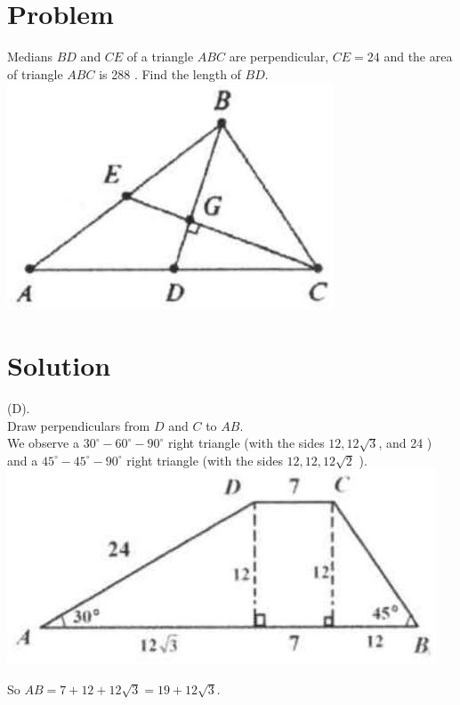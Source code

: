 \documentclass{article}
\begin{document}
\section*{Problem}
Medians \(B D\) and \(C E\) of a triangle \(A B C\) are perpendicular, \(C E=24\) and the area of triangle \(A B C\) is 288 . Find the length of \(B D\).\\
\centering
\includegraphics[width=\textwidth]{images/015(2).jpg}

\section*{Solution}
(D).\\
Draw perpendiculars from \(D\) and \(C\) to \(A B\).\\
We observe a \(30^{\circ}-60^{\circ}-90^{\circ}\) right triangle (with the sides \(12,12 \sqrt{3}\), and 24 ) and a \(45^{\circ}-45^{\circ}-90^{\circ}\) right triangle (with the sides \(12,12,12 \sqrt{2}\) ).\\
\centering
\includegraphics[width=\textwidth]{images/092(2).jpg}

So \(A B=7+12+12 \sqrt{3}=19+12 \sqrt{3}\).
\end{document}
